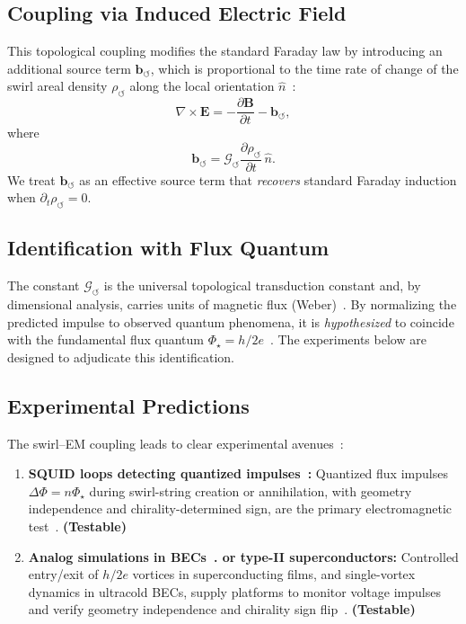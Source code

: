 \documentclass[10pt,reprint,aps,onecolumn,nofootinbib]{revtex4-2}
\newcommand{\vect}[1]{\boldsymbol{#1}} %
\newcommand{\EE}{\vect{E}}
\newcommand{\BB}{\vect{B}}
\newcommand{\testable}{\textbf{(Testable)}}
\begin{document}
\subsection*{Coupling via Induced Electric Field}
    This topological coupling modifies the standard Faraday law by introducing an additional source term $\vect{b}_{\circlearrowleft}$, which is proportional to the time rate of change of the swirl areal density $\rho_{\circlearrowleft}$ along the local orientation $\hat{n}$~\cite{2}:
    \begin{equation}
    \nabla \times \EE = - \frac{\partial \BB}{\partial t} - \vect{b}_{\circlearrowleft},
    \label{eq:modfaraday}
    \end{equation}
    where
    \[
        \vect{b}_{\circlearrowleft} = \mathcal{G}_{\circlearrowleft} \frac{\partial \rho_{\circlearrowleft}}{\partial t} \,\hat{n}.
    \]
    We treat $\vect{b}_{\circlearrowleft}$ as an effective source term that \emph{recovers} standard Faraday induction when $\partial_t \rho_{\circlearrowleft}=0$.

\subsection*{Identification with Flux Quantum}
    The constant $\mathcal{G}_{\circlearrowleft}$ is the universal topological transduction constant and, by dimensional analysis, carries units of magnetic flux (Weber)~\cite{2}. By normalizing the predicted impulse to observed quantum phenomena, it is \emph{hypothesized} to coincide with the fundamental flux quantum $\Phi_\star=h/2e$~\cite{2}. The experiments below are designed to adjudicate this identification.

\subsection*{Experimental Predictions}
    The swirl–EM coupling leads to clear experimental avenues~\cite{2}:
    \begin{enumerate}
    \item \textbf{SQUID loops detecting quantized impulses~\cite{2,5,10,11}:} Quantized flux impulses $\Delta\Phi=n\Phi_\star$ during swirl-string creation or annihilation, with geometry independence and chirality-determined sign, are the primary electromagnetic test~\cite{2}. \testable
    \item \textbf{Analog simulations in BECs~\cite{13,14}. or type-II superconductors:} Controlled entry/exit of $h/2e$ vortices in superconducting films, and single-vortex dynamics in ultracold BECs, supply platforms to monitor voltage impulses and verify geometry independence and chirality sign flip~\cite{2}. \testable
    \end{enumerate}
\end{document}
